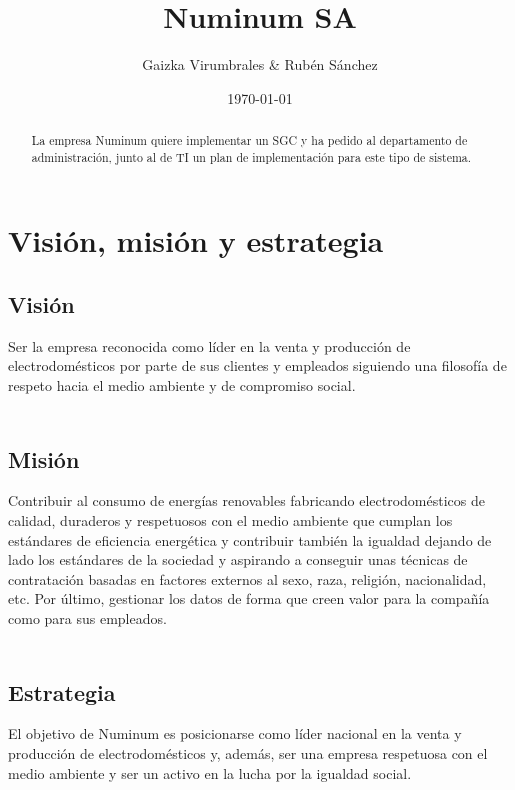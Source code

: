 \documentclass[a4paper]{article}
\title{Numinum SA}
\author{Gaizka Virumbrales \& Rubén Sánchez}
\date{\today}
\begin{document}
\maketitle
\begin{abstract}
La empresa Numinum quiere implementar un SGC y ha pedido al departamento de administración, junto al de TI un plan de implementación para este tipo de sistema.
\end{abstract}


\tableofcontents
\newpage

\section{Visión, misión y estrategia}


\subsection{Visión}
\label{sec:vision}

Ser la empresa reconocida como líder en la venta y producción de electrodomésticos por parte de sus clientes y empleados siguiendo una filosofía de respeto hacia el medio ambiente y de compromiso social.
\\
\\

\subsection{Misión}
\label{sec:mision}

Contribuir al consumo de energías renovables fabricando electrodomésticos de calidad, duraderos y respetuosos con el medio ambiente que cumplan los estándares de eficiencia energética y contribuir también la igualdad dejando de lado los estándares de la sociedad y aspirando a conseguir unas técnicas de contratación basadas en factores externos al sexo, raza, religión, nacionalidad, etc. Por último, gestionar los datos de forma que creen valor para la compañía como para sus empleados.
%
\\
\\

\subsection{Estrategia}

El objetivo de Numinum es posicionarse como líder nacional en la venta y producción de electrodomésticos y, además, ser una empresa respetuosa con el medio ambiente y ser un activo en la lucha por la igualdad social.
\end{document}
